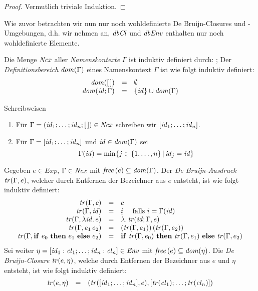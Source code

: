\documentclass[12pt,fleqn]{article}
\newcommand{\cl}{\name{cl}}
\begin{document}
\begin{proof}
  Vermutlich triviale Induktion.
\end{proof}

Wie zuvor betrachten wir nun nur noch wohldefinierte De Bruijn-Closures und -Umgebungen, d.h. wir nehmen an,
${\text{\it dbCl\/}}$ und ${\text{\it dbEnv\/}}$ enthalten nur noch wohldefinierte Elemente.

\begin{definition}[Namenskontext]
  Die Menge ${\text{\it Ncx\/}}$ aller {\em Namenskontexte} $\Gamma$ ist induktiv definiert durch:
  \bgram
  \Gamma \is [\,] \mid \id;\Gamma
  \egram
  Der {\em Definitionsbereich} ${\text{\it dom\/}}(\Gamma)$ eines Namenskontext $\Gamma$ ist wie folgt induktiv definiert:
  \[\begin{array}{rcl}
    {\text{\it dom\/}}([\,]) &=& \emptyset \\
    {\text{\it dom\/}}({\text{\it id\/}};\Gamma) &=& \{{\text{\it id\/}}\} \cup {\text{\it dom\/}}(\Gamma)
  \end{array}\]
\end{definition}

\noindent Schreibweisen
\begin{enumerate}
\item F\"ur $\Gamma=({\text{\it id\/}}_1;\ldots;{\text{\it id\/}}_n;[\,])\in{\text{\it Ncx\/}}$ schreiben wir $[{\text{\it id\/}}_1;\ldots;{\text{\it id\/}}_n]$.
\item F\"ur $\Gamma=[{\text{\it id\/}}_1;\ldots;{\text{\it id\/}}_n]$ und ${\text{\it id\/}}\in{\text{\it dom\/}}(\Gamma)$ sei
  \[ \Gamma({\text{\it id\/}}) = \min\{j \in \{1,\ldots,n\}\,|\, {\text{\it id\/}}_j = {\text{\it id\/}}\} \]
\end{enumerate}

\begin{definition}[\"Ubersetzungsfunktion]
  Gegeben $e \in Exp$, $\Gamma\in{\text{\it Ncx\/}}$ mit ${\text{\it free\/}}\,(e) \subseteq {\text{\it dom\/}}(\Gamma)$. Der {\em De Bruijn-Ausdruck}
  ${\text{\it tr\/}}(\Gamma,e)$, welcher durch Entfernen der Bezeichner aus $e$ entsteht, ist wie folgt induktiv definiert:
  \[\begin{array}{rcl}
    {\text{\it tr\/}}(\Gamma,c) &=& c \\
    {\text{\it tr\/}}(\Gamma,{\text{\it id\/}}) &=& \underline{i} \quad \text{ falls } i = \Gamma({\text{\it id\/}}) \\
    {\text{\it tr\/}}(\Gamma,\lambda {\text{\it id\/}}.\,e) &=& \lambda .\,{\text{\it tr\/}}({\text{\it id\/}};\Gamma,e) \\
    {\text{\it tr\/}}(\Gamma,e_1\,e_2) &=& ({\text{\it tr\/}}(\Gamma,e_1))\,({\text{\it tr\/}}(\Gamma,e_2)) \\
    {\text{\it tr\/}}(\Gamma,\mathbf{if}\ e_0\ \mathbf{then}\ e_1\ \mathbf{else}\ e_2) &=& \mathbf{if}\ {\text{\it tr\/}}(\Gamma,e_0)\ \mathbf{then}\ {\text{\it tr\/}}(\Gamma,e_1)\ \mathbf{else}\ {\text{\it tr\/}}(\Gamma,e_2)
  \end{array}\]
  Sei weiter $\eta=[\id_1:\cl_1;\ldots;\id_n:\cl_n]\in\Env$ mit ${\text{\it free\/}}\,(e)\subseteq {\text{\it dom\/}}(\eta)$. Die
  {\em De Bruijn-Closure} ${\text{\it tr\/}}(e,\eta)$, welche durch Entfernen der Bezeichner aus $e$ und $\eta$ entsteht,
  ist wie folgt induktiv definiert:
  \[\begin{array}{rcl}
    \tr{e,\eta} &=& (\tr{[\id_1;\ldots;\id_n],e},[\tr{\cl_1};\ldots;\tr{\cl_n}])
  \end{array}\]
\end{definition}
\end{document}
